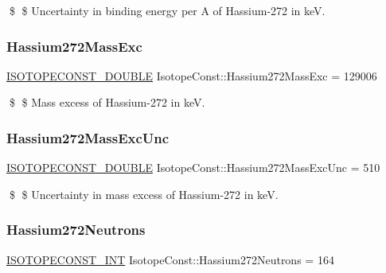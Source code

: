 \$ \$ Uncertainty in binding energy per A of Hassium-\/272 in keV. \mbox{\label{group___isotope_const-_hassium-_hs272_ga3bf3d909553a10ae36931faed7540980}} 
\subsubsection{\texorpdfstring{Hassium272\+Mass\+Exc}{Hassium272MassExc}}
{\footnotesize\ttfamily \mbox{\hyperlink{group___isotope_const-_macros_ga8f45a7272ce02c0b4c65c44636ed719a}{I\+S\+O\+T\+O\+P\+E\+C\+O\+N\+S\+T\+\_\+\+D\+O\+U\+B\+LE}} Isotope\+Const\+::\+Hassium272\+Mass\+Exc = 129006}

\$ \$ Mass excess of Hassium-\/272 in keV. \mbox{\label{group___isotope_const-_hassium-_hs272_gaa3bfcf3e2cf7bcb6c20953765385ae51}} 
\subsubsection{\texorpdfstring{Hassium272\+Mass\+Exc\+Unc}{Hassium272MassExcUnc}}
{\footnotesize\ttfamily \mbox{\hyperlink{group___isotope_const-_macros_ga8f45a7272ce02c0b4c65c44636ed719a}{I\+S\+O\+T\+O\+P\+E\+C\+O\+N\+S\+T\+\_\+\+D\+O\+U\+B\+LE}} Isotope\+Const\+::\+Hassium272\+Mass\+Exc\+Unc = 510}

\$ \$ Uncertainty in mass excess of Hassium-\/272 in keV. \mbox{\label{group___isotope_const-_hassium-_hs272_ga8606fe8477d3bea51858eef7f3416d19}} 
\subsubsection{\texorpdfstring{Hassium272\+Neutrons}{Hassium272Neutrons}}
{\footnotesize\ttfamily \mbox{\hyperlink{group___isotope_const-_macros_ga5f18360b3e99483a35c32d789e62621c}{I\+S\+O\+T\+O\+P\+E\+C\+O\+N\+S\+T\+\_\+\+I\+NT}} Isotope\+Const\+::\+Hassium272\+Neutrons = 164}

